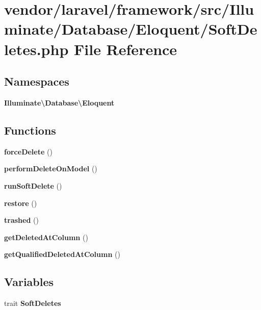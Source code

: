 \section{vendor/laravel/framework/src/\+Illuminate/\+Database/\+Eloquent/\+Soft\+Deletes.php File Reference}
\label{_soft_deletes_8php}
\subsection*{Namespaces}
\begin{DoxyCompactItemize}
\item 
 {\bf Illuminate\textbackslash{}\+Database\textbackslash{}\+Eloquent}
\end{DoxyCompactItemize}
\subsection*{Functions}
\begin{DoxyCompactItemize}
\item 
{\bf force\+Delete} ()
\item 
{\bf perform\+Delete\+On\+Model} ()
\item 
{\bf run\+Soft\+Delete} ()
\item 
{\bf restore} ()
\item 
{\bf trashed} ()
\item 
{\bf get\+Deleted\+At\+Column} ()
\item 
{\bf get\+Qualified\+Deleted\+At\+Column} ()
\end{DoxyCompactItemize}
\subsection*{Variables}
\begin{DoxyCompactItemize}
\item 
trait {\bf Soft\+Deletes}
\end{DoxyCompactItemize}
